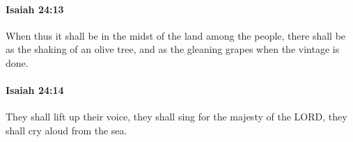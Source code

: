		\paragraph{Isaiah 24:13} %
			\label{ISAIAH-24-13}

			When thus it shall be in the midst of the land among the people, there shall be as the shaking of an olive tree, and as the gleaning grapes when the vintage is done.


		\paragraph{Isaiah 24:14} %
			\label{ISAIAH-24-14}

			They shall lift up their voice, they shall sing for the majesty of the LORD, they shall cry aloud from the sea.


